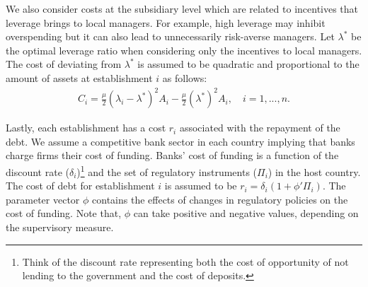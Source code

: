 \documentclass[12pt]{article}
\begin{document}
	We also consider costs at the subsidiary level which are related to incentives that leverage brings to local managers. For example, high leverage may inhibit overspending but it can also lead to unnecessarily risk-averse managers. Let $\lambda^*$ be the optimal leverage ratio when considering only the incentives to local managers. The cost of deviating from $\lambda^*$ is assumed to be quadratic and proportional to the amount of assets at establishment $i$ as follows:  
	\begin{equation}
	\begin{aligned}
	C_i=\frac{\mu}{2}(\lambda_i-\lambda^*)^2A_i-\frac{\mu}{2}(\lambda^*)^2A_i, \quad i=1,...,n.
	\end{aligned}
	\label{eq:agency cost}
	\end{equation}	
		
	Lastly, each establishment has a cost $r_i$ associated with the repayment of the debt. We assume a competitive bank sector in each country implying that banks charge firms their cost of funding. Banks' cost of funding is a function of the discount rate ($\delta_i$)\footnote{Think of the discount rate representing both the cost of opportunity of not lending to the government and the cost of deposits.}  and the set of regulatory instruments ($\Pi_i$) in the host country. The cost of debt for establishment $i$ is assumed to be $r_i=\delta_i(1+\phi'\Pi_i)$. The parameter vector $\phi$ contains the effects of changes in regulatory policies on the cost of funding. Note that, $\phi$ can take positive and negative values, depending on the supervisory measure.
	
\end{document}
